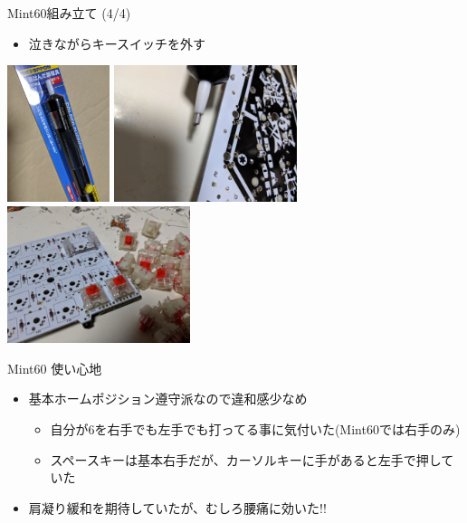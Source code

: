 \documentclass[cjk,dvipdfmx,10pt,compress,fragile%
hyperref={bookmarks=true,bookmarksnumbered=true,bookmarksopen=false,%
colorlinks=false,%
pdftitle={第 134 回 関西 Debian 勉強会},%
pdfauthor={小林},%
pdfsubject={資料},%
}]{beamer}
\begin{document}
\begin{frame}[fragile,t]{Mint60組み立て (4/4)}
 \begin{itemize}
  \item 泣きながらキースイッチを外す
 \end{itemize}
 \begin{center}
  \includegraphics[keepaspectratio,height=4cm]{./img/mint60-build-05.jpg} \hspace*{.3zw}
  \includegraphics[keepaspectratio,height=4cm]{./img/mint60-build-06.jpg} \hspace*{.3zw}
  \includegraphics[keepaspectratio,height=4cm]{./img/mint60-build-07.jpg}
 \end{center}
 \begin{itemize}
 \end{itemize}
\end{frame}

\begin{frame}[fragile,t]{Mint60 使い心地}
 \begin{itemize}
  \item 基本ホームポジション遵守派なので違和感少なめ
	\begin{itemize}
	 \item 自分が6を右手でも左手でも打ってる事に気付いた(Mint60では右手のみ)
	 \item スペースキーは基本右手だが、カーソルキーに手があると左手で押していた
	\end{itemize}
  \item 肩凝り緩和を期待していたが、むしろ腰痛に効いた!!
 \end{itemize}
\end{frame}
\end{document}
